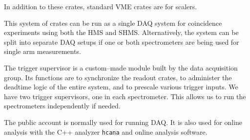 {In addition to these crates, standard VME crates are for scalers.

This system of crates can be run as a single DAQ system for
coincidence experiments using both the HMS and SHMS.  Alternatively,
the system can be split into separate DAQ setups if one or both
spectrometers are being used for single arm measurements.

\par
The trigger supervisor is a custom--made
module built by the data
acquisition group.  Its functions are to
synchronize the readout crates, to administer
the deadtime logic of the entire system, and
to prescale various trigger inputs.
We have two trigger supervisors,
one in each spectrometer.  This allows us to
run the spectrometers independently if needed.

\par
The public account  is normally
used for running DAQ.  It is also used for online
analysis with the C++ analyzer \texttt{hcana} and online analysis software.




\obsolete{ %

\section{General Computer Information}

\par
In the counting room we have various computers
for DAQ, analysis, and controls.  (Control systems are described
in Chapter~\ref{chap:controls}.)
The DAQ computer's names are denoted by \mycomp{cdaqlN} and \mycomp{hcdeskN},
where N is a number.

\par
To reboot the Linux machines, first hit \mycomp{Ctrl-Alt-F1}
to switch to a text console, then hit \mycomp{Ctrl-Alt-Del}
to reboot.
If power fails for a prolonged time,
you must shutdown before the UPS fails.


}}
